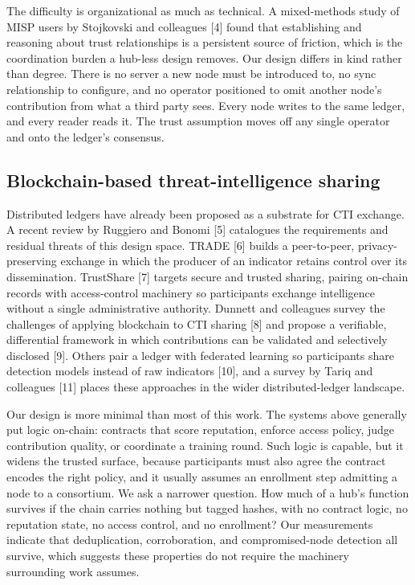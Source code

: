 \documentclass[conference]{IEEEtran}
\begin{document}
The difficulty is organizational as much as technical. A mixed-methods study of MISP users by Stojkovski and colleagues [4] found that establishing and reasoning about trust relationships is a persistent source of friction, which is the coordination burden a hub-less design removes. Our design differs in kind rather than degree. There is no server a new node must be introduced to, no sync relationship to configure, and no operator positioned to omit another node's contribution from what a third party sees. Every node writes to the same ledger, and every reader reads it. The trust assumption moves off any single operator and onto the ledger's consensus.

\subsection{Blockchain-based threat-intelligence sharing}

Distributed ledgers have already been proposed as a substrate for CTI exchange. A recent review by Ruggiero and Bonomi [5] catalogues the requirements and residual threats of this design space. TRADE [6] builds a peer-to-peer, privacy-preserving exchange in which the producer of an indicator retains control over its dissemination. TrustShare [7] targets secure and trusted sharing, pairing on-chain records with access-control machinery so participants exchange intelligence without a single administrative authority. Dunnett and colleagues survey the challenges of applying blockchain to CTI sharing [8] and propose a verifiable, differential framework in which contributions can be validated and selectively disclosed [9]. Others pair a ledger with federated learning so participants share detection models instead of raw indicators [10], and a survey by Tariq and colleagues [11] places these approaches in the wider distributed-ledger landscape.

Our design is more minimal than most of this work. The systems above generally put logic on-chain: contracts that score reputation, enforce access policy, judge contribution quality, or coordinate a training round. Such logic is capable, but it widens the trusted surface, because participants must also agree the contract encodes the right policy, and it usually assumes an enrollment step admitting a node to a consortium. We ask a narrower question. How much of a hub's function survives if the chain carries nothing but tagged hashes, with no contract logic, no reputation state, no access control, and no enrollment? Our measurements indicate that deduplication, corroboration, and compromised-node detection all survive, which suggests these properties do not require the machinery surrounding work assumes.
\end{document}
